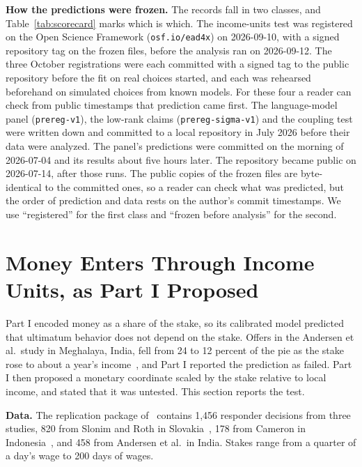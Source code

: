 \documentclass[journal]{IEEEtran}
\begin{document}
\textbf{How the predictions were frozen.}
The records fall in two classes, and Table~\ref{tab:scorecard} marks which is which.
The income-units test was registered on the Open Science Framework (\texttt{osf.io/ead4x}) on 2026-09-10, with a signed repository tag on the frozen files, before the analysis ran on 2026-09-12.
The three October registrations were each committed with a signed tag to the public repository before the fit on real choices started, and each was rehearsed beforehand on simulated choices from known models.
For these four a reader can check from public timestamps that prediction came first.
The language-model panel (\texttt{prereg-v1}), the low-rank claims (\texttt{prereg-sigma-v1}) and the coupling test were written down and committed to a local repository in July 2026 before their data were analyzed.
The panel's predictions were committed on the morning of 2026-07-04 and its results about five hours later.
The repository became public on 2026-07-14, after those runs.
The public copies of the frozen files are byte-identical to the committed ones, so a reader can check what was predicted, but the order of prediction and data rests on the author's commit timestamps.
We use ``registered'' for the first class and ``frozen before analysis'' for the second.

\section{Money Enters Through Income Units, as Part I Proposed}
\label{sec:income}

Part I encoded money as a share of the stake, so its calibrated model predicted that ultimatum behavior does not depend on the stake.
Offers in the Andersen et al.\ study in Meghalaya, India, fell from 24 to 12 percent of the pie as the stake rose to about a year's income~\cite{andersen2011}, and Part I reported the prediction as failed.
Part I then proposed a monetary coordinate scaled by the stake relative to local income, and stated that it was untested.
This section reports the test.

\textbf{Data.}
The replication package of~\cite{andersen2011} contains 1{,}456 responder decisions from three studies, 820 from Slonim and Roth in Slovakia~\cite{slonim1998}, 178 from Cameron in Indonesia~\cite{cameron1999}, and 458 from Andersen et al.\ in India.
Stakes range from a quarter of a day's wage to 200 days of wages.
\end{document}
